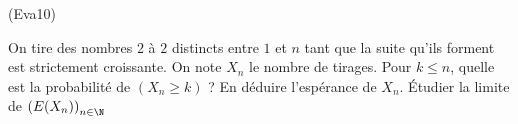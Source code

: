 \begin{tiny}(Eva10)\end{tiny} On tire des nombres $2$ à $2$ distincts entre $1$ et $n$ tant que la suite qu'ils forment est strictement croissante. On note $X_n$ le nombre de tirages. Pour $k\leq n$, quelle est la probabilité de $(X_n\geq k)$ ? En déduire l'espérance de $X_n$. \'Etudier la limite de $\left( E(X_n)\right) _{n\in \N}$
